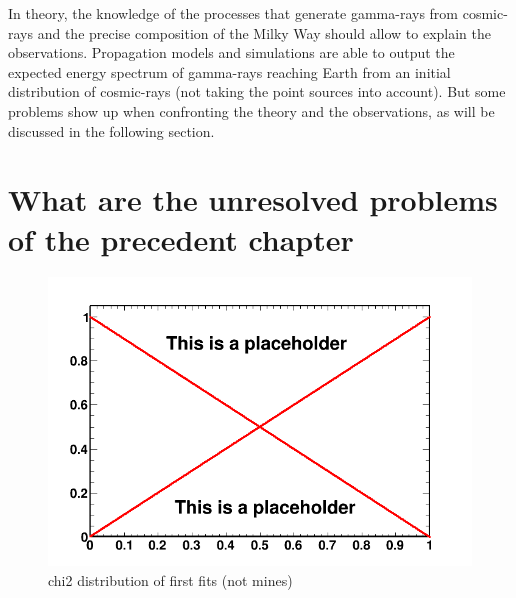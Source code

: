 

In theory, the knowledge of the processes that generate gamma-rays from cosmic-rays and the precise composition of the Milky Way should allow to explain the observations. Propagation models and simulations are able to output the expected energy spectrum of gamma-rays reaching Earth from an initial distribution of cosmic-rays (not taking the point sources into account). But some problems show up when confronting the theory and the observations, as will be discussed in the following section.



\section{What are the unresolved problems of the precedent chapter}
%	
%
\begin{figure}
 \centering
 \includegraphics[width=.9\linewidth]{pic/dummy.png}
 \caption{chi2 distribution of first fits (not mines)}
 \label{fig:first_BKGonly_fits}
\end{figure}



